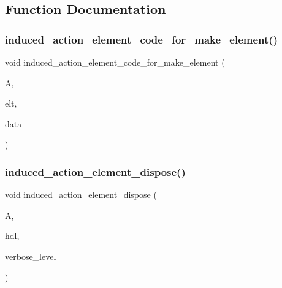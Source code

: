 \subsection{Function Documentation}
\mbox{\label{interface_8_c_af1c12dd980d376e72daaf9a383cebfdc}} 
\subsubsection{\texorpdfstring{induced\+\_\+action\+\_\+element\+\_\+code\+\_\+for\+\_\+make\+\_\+element()}{induced\_action\_element\_code\_for\_make\_element()}}
{\footnotesize\ttfamily void induced\+\_\+action\+\_\+element\+\_\+code\+\_\+for\+\_\+make\+\_\+element (\begin{DoxyParamCaption}\item[{\mbox{\hyperlink{classaction}{action}} \&}]{A,  }\item[{void $\ast$}]{elt,  }\item[{\mbox{\hyperlink{galois_8h_a09fddde158a3a20bd2dcadb609de11dc}{I\+NT}} $\ast$}]{data }\end{DoxyParamCaption})}

\mbox{\label{interface_8_c_a5bf4e1daf5b0e799af9e065ab8046f99}} 
\subsubsection{\texorpdfstring{induced\+\_\+action\+\_\+element\+\_\+dispose()}{induced\_action\_element\_dispose()}}
{\footnotesize\ttfamily void induced\+\_\+action\+\_\+element\+\_\+dispose (\begin{DoxyParamCaption}\item[{\mbox{\hyperlink{classaction}{action}} \&}]{A,  }\item[{\mbox{\hyperlink{galois_8h_a09fddde158a3a20bd2dcadb609de11dc}{I\+NT}}}]{hdl,  }\item[{\mbox{\hyperlink{galois_8h_a09fddde158a3a20bd2dcadb609de11dc}{I\+NT}}}]{verbose\+\_\+level }\end{DoxyParamCaption})}

